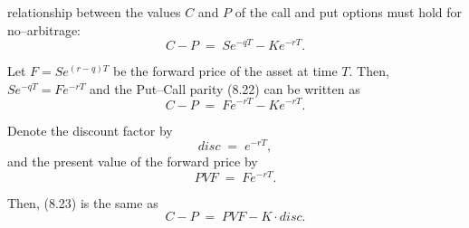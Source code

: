 
relationship between the values $C$ and $P$ of the call and put options must hold for
no--arbitrage:
\begin{equation}
C - P \;=\; Se^{-qT} - Ke^{-rT}.
\end{equation}

Let $F = Se^{(r-q)T}$ be the forward price of the asset at time $T$. Then,
$Se^{-qT} = Fe^{-rT}$ and the Put--Call parity (8.22) can be written as
\begin{equation}
C - P \;=\; Fe^{-rT} - Ke^{-rT}.
\end{equation}

Denote the discount factor by
\begin{equation}
disc \;=\; e^{-rT},
\end{equation}
and the present value of the forward price by
\begin{equation}
PVF \;=\; Fe^{-rT}.
\end{equation}

Then, (8.23) is the same as
\begin{equation}
C - P \;=\; PVF - K \cdot disc.
\end{equation}

